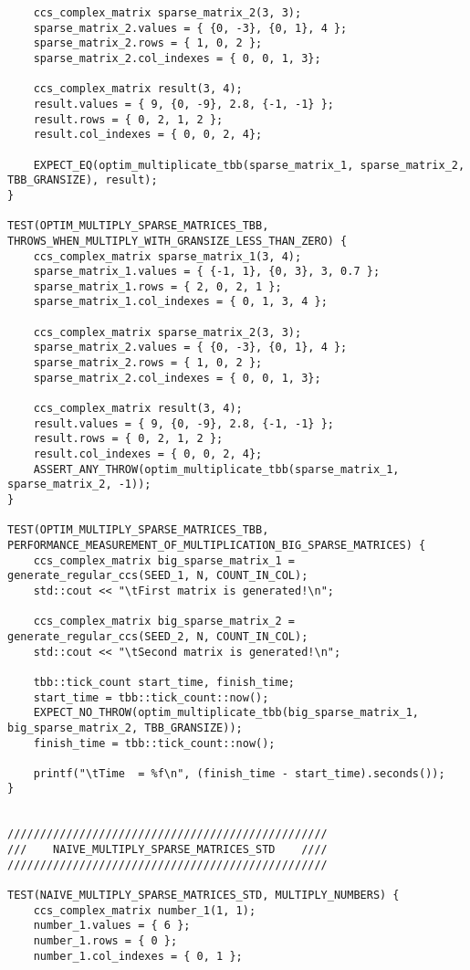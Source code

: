 \documentclass{report}
\begin{document}
\begin{itemize}
\begin{itemize}
\begin{lstlisting}
    ccs_complex_matrix sparse_matrix_2(3, 3);
    sparse_matrix_2.values = { {0, -3}, {0, 1}, 4 };
    sparse_matrix_2.rows = { 1, 0, 2 };
    sparse_matrix_2.col_indexes = { 0, 0, 1, 3};

    ccs_complex_matrix result(3, 4);
    result.values = { 9, {0, -9}, 2.8, {-1, -1} };
    result.rows = { 0, 2, 1, 2 };
    result.col_indexes = { 0, 0, 2, 4};

    EXPECT_EQ(optim_multiplicate_tbb(sparse_matrix_1, sparse_matrix_2, TBB_GRANSIZE), result);
}

TEST(OPTIM_MULTIPLY_SPARSE_MATRICES_TBB, THROWS_WHEN_MULTIPLY_WITH_GRANSIZE_LESS_THAN_ZERO) {
    ccs_complex_matrix sparse_matrix_1(3, 4);
    sparse_matrix_1.values = { {-1, 1}, {0, 3}, 3, 0.7 };
    sparse_matrix_1.rows = { 2, 0, 2, 1 };
    sparse_matrix_1.col_indexes = { 0, 1, 3, 4 };

    ccs_complex_matrix sparse_matrix_2(3, 3);
    sparse_matrix_2.values = { {0, -3}, {0, 1}, 4 };
    sparse_matrix_2.rows = { 1, 0, 2 };
    sparse_matrix_2.col_indexes = { 0, 0, 1, 3};

    ccs_complex_matrix result(3, 4);
    result.values = { 9, {0, -9}, 2.8, {-1, -1} };
    result.rows = { 0, 2, 1, 2 };
    result.col_indexes = { 0, 0, 2, 4};
    ASSERT_ANY_THROW(optim_multiplicate_tbb(sparse_matrix_1, sparse_matrix_2, -1));
}

TEST(OPTIM_MULTIPLY_SPARSE_MATRICES_TBB, PERFORMANCE_MEASUREMENT_OF_MULTIPLICATION_BIG_SPARSE_MATRICES) {
    ccs_complex_matrix big_sparse_matrix_1 = generate_regular_ccs(SEED_1, N, COUNT_IN_COL);
    std::cout << "\tFirst matrix is generated!\n";

    ccs_complex_matrix big_sparse_matrix_2 = generate_regular_ccs(SEED_2, N, COUNT_IN_COL);
    std::cout << "\tSecond matrix is generated!\n";

    tbb::tick_count start_time, finish_time;
    start_time = tbb::tick_count::now();
    EXPECT_NO_THROW(optim_multiplicate_tbb(big_sparse_matrix_1, big_sparse_matrix_2, TBB_GRANSIZE));
    finish_time = tbb::tick_count::now();

    printf("\tTime  = %f\n", (finish_time - start_time).seconds());
}


/////////////////////////////////////////////////
///    NAIVE_MULTIPLY_SPARSE_MATRICES_STD    ////
/////////////////////////////////////////////////

TEST(NAIVE_MULTIPLY_SPARSE_MATRICES_STD, MULTIPLY_NUMBERS) {
    ccs_complex_matrix number_1(1, 1);
    number_1.values = { 6 };
    number_1.rows = { 0 };
    number_1.col_indexes = { 0, 1 };


\end{lstlisting}
\end{itemize}
\end{itemize}
\end{document}
